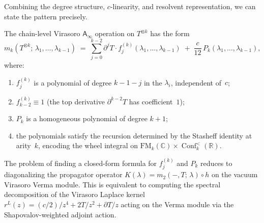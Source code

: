 \documentclass[11pt]{article}
\newcommand{\C}{\mathbb{C}}
\newcommand{\R}{\mathbb{R}}
\newcommand{\Ainf}{\mathsf{A}_{\infty}}
\newcommand{\FM}{\mathrm{FM}}
\DeclareMathOperator{\Conf}{Conf}
\begin{document}
Combining the degree structure, $c$-linearity, and resolvent
representation, we can state the pattern precisely.

\begin{conjecture}\label{conj:closed-form-wn}
The chain-level Virasoro $\Ainf$ operation on $T^{\otimes k}$ has
the form
\begin{equation}\label{eq:mk-pattern-wn}
m_k(T^{\otimes k};\,\lambda_1, \ldots, \lambda_{k-1})
\;=\;
\sum_{j=0}^{k-2}
\partial^j T \cdot
f_j^{(k)}(\lambda_1, \ldots, \lambda_{k-1})
\;+\;
\frac{c}{12}\,P_k(\lambda_1, \ldots, \lambda_{k-1}),
\end{equation}
where:
\begin{enumerate}[label=\textup{(\alph*)},nosep]
\item $f_j^{(k)}$ is a polynomial of degree $k-1-j$ in the
  $\lambda_i$, independent of~$c$;
\item $f_{k-2}^{(k)} \equiv 1$
  \textup{(}the top derivative $\partial^{k-2}T$ has
  coefficient~$1$\textup{)};
\item $P_k$ is a homogeneous polynomial of degree $k+1$;
\item the polynomials satisfy the recursion determined by the
  Stasheff identity at arity~$k$, encoding the wheel integral
  on $\FM_k(\C) \times \Conf_k^{<}(\R)$.
\end{enumerate}

The problem of finding a closed-form formula for $f_j^{(k)}$ and
$P_k$ reduces to diagonalizing the propagator operator
$K(\lambda) = m_2(-, T;\, \lambda) \circ h$
on the vacuum Virasoro Verma module.  This is equivalent to
computing the spectral decomposition of the Virasoro
Laplace kernel $r^L(z) = (c/2)/z^4 + 2T/z^2 + \partial T/z$
acting on the Verma module via the Shapovalov-weighted adjoint
action.
\end{conjecture}
\end{document}
